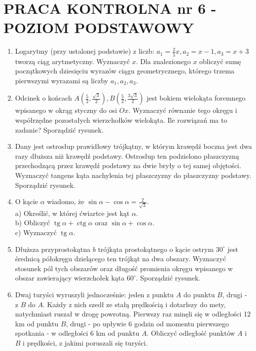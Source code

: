 \documentclass[10pt]{article}
\begin{document}
\section*{PRACA KONTROLNA nr 6 - POZIOM PODSTAWOWY}
\begin{enumerate}
  \item Logarytmy (przy ustalonej podstawie) z liczb: $a_{1}=\frac{2}{5} x, a_{2}=x-1, a_{3}=x+3$ tworzą ciąg arytmetyczny. Wyznaczyć $x$. Dla znalezionego $x$ obliczyć sumę początkowych dziesięciu wyrazów ciągu geometrycznego, którego trzema pierwszymi wyrazami są liczby $a_{1}, a_{2}, a_{3}$.
  \item Odcinek o końcach $A\left(\frac{5}{2}, \frac{\sqrt{3}}{2}\right), B\left(\frac{5}{2}, \frac{3 \sqrt{3}}{2}\right)$ jest bokiem wielokąta foremnego wpisanego w okrąg styczny do osi $O x$. Wyznaczyć równanie tego okręgu i współrzędne pozostałych wierzchołków wielokąta. Ile rozwiązań ma to zadanie? Sporządzić rysunek.
  \item Dany jest ostrosłup prawidłowy trójkątny, w którym krawędź boczna jest dwa razy dłuższa niż krawędź podstawy. Ostrosłup ten podzielono płaszczyzną przechodzącą przez krawędź podstawy na dwie bryły o tej samej objętości. Wyznaczyć tangens kąta nachylenia tej płaszczyzny do płaszczyzny podstawy. Sporządzić rysunek.
  \item O kącie $\alpha$ wiadomo, że $\sin \alpha-\cos \alpha=\frac{2}{\sqrt{3}}$.\\
a) Określić, w której ćwiartce jest kąt $\alpha$.\\
b) Obliczyć $\operatorname{tg} \alpha+\operatorname{ctg} \alpha$ oraz $\sin \alpha+\cos \alpha$.\\
c) Wyznaczyć $\operatorname{tg} \alpha$.
  \item Dłuższa przyprostokątna $b$ trójkąta prostokątnego o kącie ostrym $30^{\circ}$ jest średnicą półokręgu dzielącego ten trójkąt na dwa obszary. Wyznaczyć stosunek pól tych obszarów oraz długość promienia okręgu wpisanego w obszar zawierający wierzchołek kąta $60^{\circ}$. Sporządzić rysunek.
  \item Dwaj turyści wyruszyli jednocześnie: jeden z punktu $A$ do punktu $B$, drugi - z $B$ do $A$. Każdy z nich szedł ze stałą prędkością i dotarłszy do mety, natychmiast ruszał w drogę powrotną. Pierwszy raz minęli się w odległości 12 km od punktu $B$, drugi - po upływie 6 godzin od momentu pierwszego spotkania - w odległości 6 km od punktu $A$. Obliczyć odległość punktów $A$ i $B$ i prędkości, z jakimi poruszali się turyści.
\end{enumerate}
\end{document}
